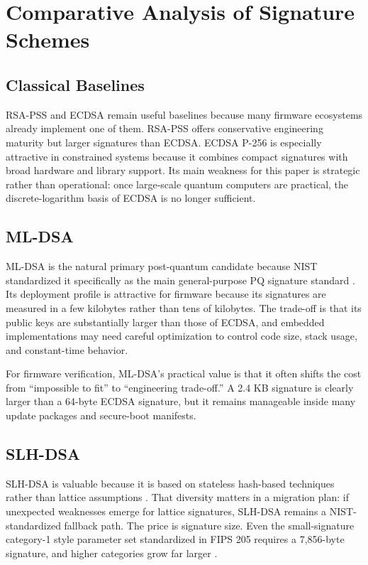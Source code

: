 \section{Comparative Analysis of Signature Schemes}

\subsection{Classical Baselines}

RSA-PSS and ECDSA remain useful baselines because many firmware ecosystems already implement one of them. RSA-PSS offers conservative engineering maturity but larger signatures than ECDSA. ECDSA P-256 is especially attractive in constrained systems because it combines compact signatures with broad hardware and library support. Its main weakness for this paper is strategic rather than operational: once large-scale quantum computers are practical, the discrete-logarithm basis of ECDSA is no longer sufficient.

\subsection{ML-DSA}

ML-DSA is the natural primary post-quantum candidate because NIST standardized it specifically as the main general-purpose PQ signature standard \cite{nist_pqc_release,fips204}. Its deployment profile is attractive for firmware because its signatures are measured in a few kilobytes rather than tens of kilobytes. The trade-off is that its public keys are substantially larger than those of ECDSA, and embedded implementations may need careful optimization to control code size, stack usage, and constant-time behavior.

For firmware verification, ML-DSA's practical value is that it often shifts the cost from ``impossible to fit'' to ``engineering trade-off.'' A 2.4 KB signature is clearly larger than a 64-byte ECDSA signature, but it remains manageable inside many update packages and secure-boot manifests.

\subsection{SLH-DSA}

SLH-DSA is valuable because it is based on stateless hash-based techniques rather than lattice assumptions \cite{fips205}. That diversity matters in a migration plan: if unexpected weaknesses emerge for lattice signatures, SLH-DSA remains a NIST-standardized fallback path. The price is signature size. Even the small-signature category-1 style parameter set standardized in FIPS 205 requires a 7,856-byte signature, and higher categories grow far larger \cite{fips205}.

